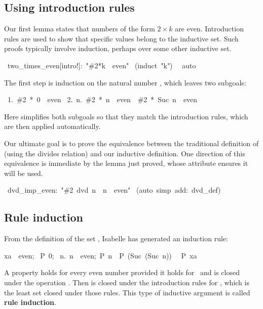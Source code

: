 \subsection{Using introduction rules}

Our first lemma states that numbers of the form $2\times k$ are even.
Introduction rules are used to show that specific values belong to the
inductive set.  Such proofs typically involve 
induction, perhaps over some other inductive set.
\begin{isabelle}
\ two_times_even[intro!]:\ "\#2*k\ \isasymin \ even"
\isanewline
{}\ (induct\ "k")\isanewline
\ \ auto\isanewline
{}
\end{isabelle}
%
The first step is induction on the natural number , which leaves
two subgoals:
\begin{isabelle}
\ 1.\ \#2\ *\ 0\ \isasymin \ even\isanewline
\ 2.\ \isasymAnd n.\ \#2\ *\ n\ \isasymin \ even\ \isasymLongrightarrow \ \#2\ *\ Suc\ n\ \isasymin \ even
\end{isabelle}
%
Here  simplifies both subgoals so that they match the introduction
rules, which are then applied automatically.

Our ultimate goal is to prove the equivalence between the traditional
definition of  (using the divides relation) and our inductive
definition.  One direction of this equivalence is immediate by the lemma
just proved, whose  attribute ensures it will be used.
\begin{isabelle}
\ dvd_imp_even:\ "\#2\ dvd\ n\ \isasymLongrightarrow \ n\ \isasymin \ even"\isanewline
{}\ (auto\ simp\ add:\ dvd_def)\isanewline
{}
\end{isabelle}

\subsection{Rule induction}
\label{sec:rule-induction}

From the definition of the set
, Isabelle has
generated an induction rule:
\begin{isabelle}
\isasymlbrakk xa\ \isasymin \ even;\isanewline
\ P\ 0;\isanewline
\ \isasymAnd n.\ \isasymlbrakk n\ \isasymin \ even;\ P\ n\isasymrbrakk \
\isasymLongrightarrow \ P\ (Suc\ (Suc\ n))\isasymrbrakk\isanewline
\ \isasymLongrightarrow \ P\ xa%
\end{isabelle}
A property  holds for every even number provided it
holds for~ and is closed under the operation
.  Then  is closed under the introduction
rules for \isa{even}, which is the least set closed under those rules. 
This type of inductive argument is called \textbf{rule induction}. 


